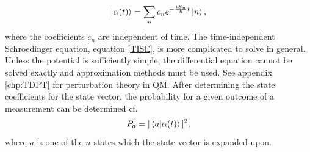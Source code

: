 \begin{equation}
	\ket{\alpha(t)}=\sum_nc_ne^{-\frac{iE_n}{\hbar}t}\ket{n},
	\label{statevec}
\end{equation} 
where the coefficients $c_n$ are independent of time. The time-independent Schroedinger equation, equation \eqref{TISE}, is more complicated to solve in general. Unless the potential is sufficiently simple, the differential equation cannot be solved exactly and approximation methods must be used. See appendix \ref{chp:TDPT} for perturbation theory in QM.
After determining the state coefficients for the state vector, the probability for a given outcome of a measurement can be determined cf.
\begin{equation}
	P_{a}=|\braket{a|\alpha(t)}|^2,
\end{equation} 
where $a$ is one of the $n$ states which the state vector is expanded upon.
